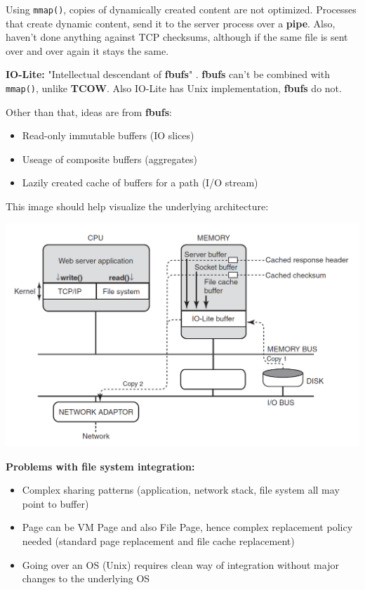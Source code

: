 Using \texttt{mmap()}, copies of dynamically created content are not optimized. Processes that create dynamic content, send it to the server process over a \textbf{pipe}. Also, haven't done anything against TCP checksums, although if the same file is sent over and over again it stays the same.

\textbf{IO-Lite:} "Intellectual descendant of \textbf{fbufs}" . \textbf{fbufs} can't be combined with \texttt{mmap()}, unlike \textbf{TCOW}. Also IO-Lite has Unix implementation, \textbf{fbufs} do not.

Other than that, ideas are from \textbf{fbufs}:

\begin{itemize}
    \item Read-only immutable buffers (IO slices)
    \item Useage of composite buffers (aggregates)
    \item Lazily created cache of buffers for a path (I/O stream)
\end{itemize}

This image should help visualize the underlying architecture:

\includegraphics[width=\textwidth]{images/chap5/io_lite}

\textbf{Problems with file system integration:} 

\begin{itemize}
    \item Complex sharing patterns (application, network stack, file system all may point to buffer)
    \item Page can be VM Page and also File Page, hence complex replacement policy needed (standard page replacement and file cache replacement)
    \item Going over an OS (Unix) requires clean way of integration without major changes to the underlying OS
\end{itemize}

